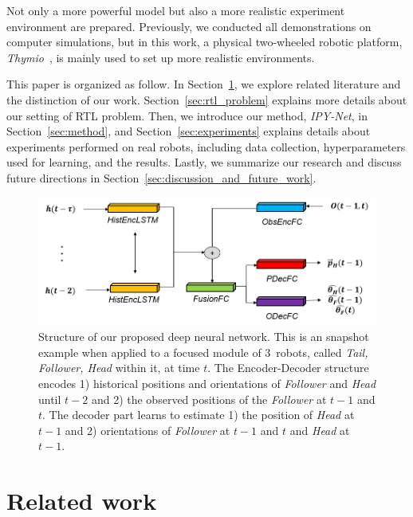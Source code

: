 \documentclass[letterpaper, 10 pt, conference]{ieeeconf}  %
\begin{document}
	Not only a more powerful model but also a more realistic experiment
	environment are prepared. Previously, we
	conducted all demonstrations on computer simulations, but in this work,
	a physical two-wheeled robotic platform, \emph{Thymio}~\cite{Shin14}, is mainly
	used to set up more realistic environments.


	This paper is organized as follow.
	In Section~\ref{sec:related_work}, we explore related literature and the distinction of our work.
	Section~\ref{sec:rtl_problem} explains more details about our setting of RTL problem.
	Then, we introduce our method, \emph{IPY-Net}, in Section~\ref{sec:method}, and
	Section~\ref{sec:experiments} explains details about experiments performed on real robots,
	including data collection, hyperparameters used for learning, and the results.
	Lastly, we summarize our research and discuss future directions
	in Section~\ref{sec:discussion_and_future_work}.

	\begin{figure}\centering
		\includegraphics[width=1.\columnwidth]{fig_DL_Pipeline}
		\caption{Structure of our proposed deep neural network.
			This is an snapshot example when applied to a focused module of
			$3$~robots, called \emph{Tail, Follower, Head} within it, at time $t$.
			The Encoder-Decoder structure encodes
			1) historical positions and orientations of \emph{Follower} and \emph{Head}
			until $t-2$ and 2) the observed positions of the \emph{Follower} at $t-1$ and $t$.
			The decoder part learns to estimate 1) the position of \emph{Head} at $t-1$ and
			2) orientations of \emph{Follower} at $t-1$ and $t$ and \emph{Head} at $t-1$.
		}
		\label{fig:DL_Pipeline}
	\end{figure}


	\section{Related work}
	\label{sec:related_work}
\end{document}
